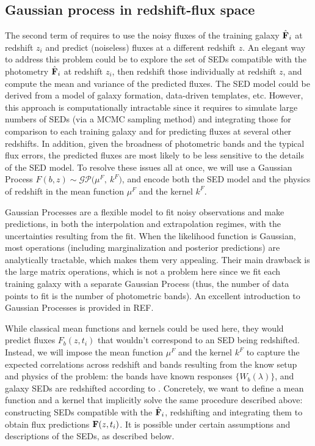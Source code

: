 \documentclass[aps,prd,showpacs,superscriptaddress,groupedaddress]{revtex4}  %
\begin{document}
\subsection{Gaussian process in redshift-flux space}

The second term of  requires to use the noisy fluxes of the training galaxy $\hat{\mat{F}}_i$ at redshift $z_i$ and predict (noiseless) fluxes at a different redshift $z$.
An elegant way to address this problem could be to explore the set of SEDs compatible with the photometry $\hat{\mat{F}}_i$ at redshift $z_i$, then redshift those individually at redshift $z$, and compute the mean and variance of the predicted fluxes.
The SED model could be derived from a model of galaxy formation, data-driven templates, etc. 
However, this approach is computationally intractable since it requires to simulate large numbers of SEDs (\eg via a MCMC sampling method) and integrating those for comparison to each training galaxy and for predicting fluxes at several other redshifts. 
In addition, given the broadness of photometric bands and the typical flux errors, the predicted fluxes are most likely to be less sensitive to the details of the SED model.
To resolve these issues all at once, we will use a Gaussian Process $F(b, z) \sim \mathcal{GP}\bigl( \mu^F, \ k^F\bigr)$, and encode both the SED model and the physics of redshift in the mean function $\mu^F$ and the kernel $k^F$.

Gaussian Processes are a flexible model to fit noisy observations and make predictions, in both the interpolation and extrapolation regimes, with the uncertainties resulting from the fit.
When the likelihood function is Gaussian, most operations (including marginalization and posterior predictions) are analytically tractable, which makes them very appealing.
Their main drawback is the large matrix operations, which is not a problem here since we fit each training galaxy with a separate Gaussian Process (thus, the number of data points to fit is the number of photometric bands).
An excellent introduction to Gaussian Processes is provided in REF.

While classical mean functions and kernels could be used here, they would predict fluxes $F_b(z, t_i)$ that wouldn't correspond to an SED being redshifted.
Instead, we will impose the mean function $\mu^F$ and the kernel $k^F$ to capture the expected correlations across redshift and bands resulting from the know setup and physics of the problem: the bands have known responses $\{ W_b(\lambda)\}$, and galaxy SEDs are redshifted according to .  
Concretely, we want to define a mean function and a kernel that implicitly solve the same procedure described above: constructing SEDs compatible with the $\hat{\mat{F}}_i$, redshifting and integrating them to obtain flux predictions $\mat{F}(z, t_i)$. 
It is possible under certain assumptions and descriptions of the SEDs, as described below.
\end{document}
